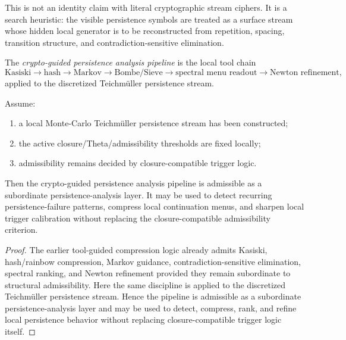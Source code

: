 \begin{remark}
\label{rem:how-to-read-the-vernam-like-heuristic}
This is not an identity claim with literal cryptographic stream ciphers.
It is a search heuristic: the visible persistence symbols are treated as a surface stream whose hidden local generator is to be reconstructed from repetition, spacing, transition structure, and contradiction-sensitive elimination.
\end{remark}

\begin{definition}
\label{def:crypto-guided-persistence-analysis-pipeline}
The \emph{crypto-guided persistence analysis pipeline} is the local tool chain
\[
\text{Kasiski}
\to
\text{hash}
\to
\text{Markov}
\to
\text{Bombe/Sieve}
\to
\text{spectral menu readout}
\to
\text{Newton refinement},
\]
applied to the discretized Teichm\"uller persistence stream.
\end{definition}

\begin{theorem}
\label{thm:first-crypto-guided-persistence-scan-theorem}
Assume:
\begin{enumerate}
 \item a local Monte-Carlo Teichm\"uller persistence stream has been constructed;
 \item the active closure/Theta/admissibility thresholds are fixed locally;
 \item admissibility remains decided by closure-compatible trigger logic.
\end{enumerate}
Then the crypto-guided persistence analysis pipeline is admissible as a subordinate persistence-analysis layer.
It may be used to detect recurring persistence-failure patterns, compress local continuation menus, and sharpen local trigger calibration without replacing the closure-compatible admissibility criterion.
\end{theorem}

\begin{proof}
The earlier tool-guided compression logic already admits Kasiski, hash/rainbow compression, Markov guidance, contradiction-sensitive elimination, spectral ranking, and Newton refinement provided they remain subordinate to structural admissibility.
Here the same discipline is applied to the discretized Teichm\"uller persistence stream.
Hence the pipeline is admissible as a subordinate persistence-analysis layer and may be used to detect, compress, rank, and refine local persistence behavior without replacing closure-compatible trigger logic itself.
\end{proof}

